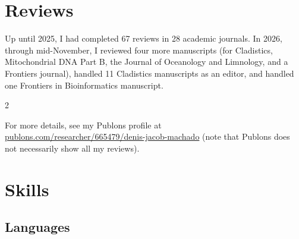 \documentclass[11pt, letterpaper, sans]{moderncv}
\begin{document}
\section{Reviews}

    Up until 2025, I had completed 67 reviews in 28 academic journals. In 2026, through mid-November, I reviewed four more manuscripts (for Cladistics, Mitochondrial DNA Part B, the Journal of Oceanology and Limnology, and a Frontiers journal), handled 11 Cladistics manuscripts as an editor, and handled one Frontiers in Bioinformatics manuscript.\\
    
    \begin{multicols}{2}{\footnotesize
    }\end{multicols}
    
    For more details, see my Publons profile at  \href{https://publons.com/researcher/665479/denis-jacob-machado/}{publons.com/researcher/665479/denis-jacob-machado} (note that Publons does not necessarily show all my reviews).


\section{Skills}

\subsection{Languages}
\end{document}
